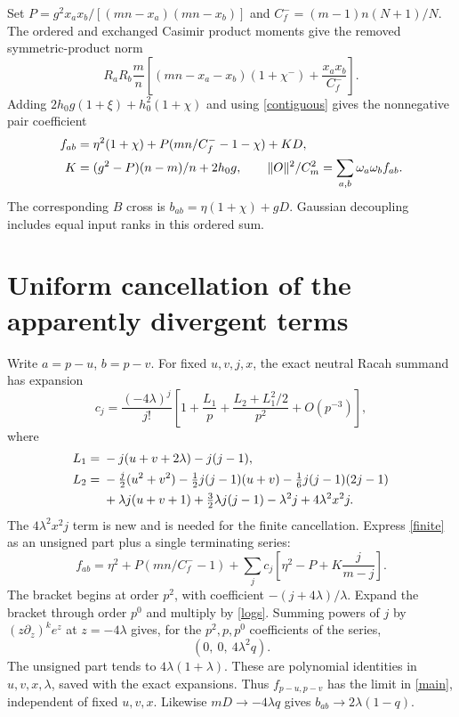 \documentclass[11pt,a4paper]{article}
\begin{document}
Set $P=g^2x_ax_b/[(mn-x_a)(mn-x_b)]$ and
$C_f^-=(m-1)n(N+1)/N$. The ordered and exchanged Casimir product
moments give the removed symmetric-product norm
\begin{equation}
 R_aR_b\frac m n
 \left[(mn-x_a-x_b)(1+\chi^-)+\frac{x_ax_b}{C_f^-}\right].
\end{equation}
Adding $2h_0g(1+\xi)+h_0^2(1+\chi)$ and using
\eqref{contiguous} gives the nonnegative pair coefficient
\begin{align}
 f_{ab}={}&\eta^2(1+\chi)+P(mn/C_f^- -1-\chi)+KD,\notag\\
 K={}&(g^2-P)(n-m)/n+2h_0g,\qquad
 \|O\|^2/C_m^2=\sum_{a,b}\omega_a\omega_b f_{ab}.\label{finite}
\end{align}
The corresponding $B$ cross is $b_{ab}=\eta(1+\chi)+gD$.
Gaussian decoupling includes equal input ranks in this ordered sum.

\newpage
\section{Uniform cancellation of the apparently divergent terms}
Write $a=p-u$, $b=p-v$. For fixed $u,v,j,x$, the exact neutral
Racah summand has expansion
\begin{equation}
 c_j=\frac{(-4\lambda)^j}{j!}
 \left[1+\frac{L_1}{p}+\frac{L_2+L_1^2/2}{p^2}+O(p^{-3})\right],
\end{equation}
where
\begin{align}
 L_1={}&-j(u+v+2\lambda)-j(j-1),\\
 L_2={}&-\tfrac j2(u^2+v^2)-\tfrac12j(j-1)(u+v)
        -\tfrac16j(j-1)(2j-1)\notag\\
       &+\lambda j(u+v+1)+\tfrac32\lambda j(j-1)
        -\lambda^2j+4\lambda^2x^2j.\label{logs}
\end{align}
The $4\lambda^2x^2j$ term is new and is needed for the finite
cancellation. Express \eqref{finite} as an unsigned part plus a
single terminating series:
\begin{equation}
 f_{ab}=\eta^2+P(mn/C_f^- -1)
   +\sum_jc_j\left[\eta^2-P+K\frac j{m-j}\right].\label{series}
\end{equation}
The bracket begins at order $p^2$, with coefficient
$-(j+4\lambda)/\lambda$. Expand the bracket through order $p^0$
and multiply by \eqref{logs}. Summing powers of $j$ by
$(z\partial_z)^ke^z$ at $z=-4\lambda$ gives, for the
$p^2,p,p^0$ coefficients of the series,
\begin{equation}
 (0,\ 0,\ 4\lambda^2q).
\end{equation}
The unsigned part tends to $4\lambda(1+\lambda)$.
These are polynomial identities in $u,v,x,\lambda$, saved with
the exact expansions. Thus $f_{p-u,p-v}$ has the limit in
\eqref{main}, independent of fixed $u,v,x$. Likewise
$mD\to-4\lambda q$ gives $b_{ab}\to2\lambda(1-q)$.
\end{document}
